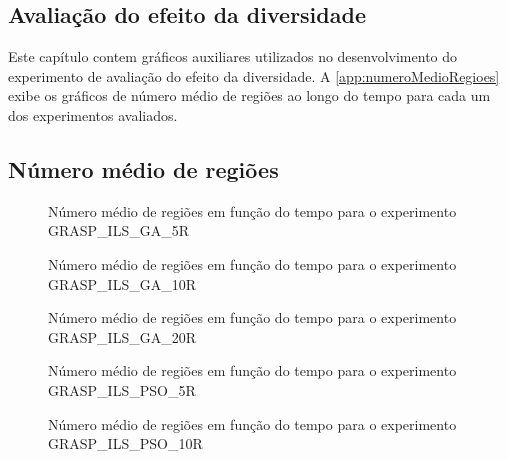 \begin{apendicesenv}
\partapendices

\chapter{Avaliação do efeito da diversidade}
Este capítulo contem gráficos auxiliares utilizados no desenvolvimento do experimento de avaliação do efeito da diversidade. A  \autoref{app:numeroMedioRegioes} exibe os gráficos de número médio de regiões ao longo do tempo para cada um dos experimentos avaliados. 

\section{Número médio de regiões}
\label{app:numeroMedioRegioes}

\begin{figure}
    \centering
    \caption{Número médio de regiões em função do tempo para o experimento GRASP\_ILS\_GA\_5R}
    
    \label{grasp_ils_ga_5r}
\end{figure}

\begin{figure}
    \centering
    \caption{Número médio de regiões em função do tempo para o experimento GRASP\_ILS\_GA\_10R}
    
    \label{grasp_ils_ga_10R}
\end{figure}

\begin{figure}
    \centering
    \caption{Número médio de regiões em função do tempo para o experimento GRASP\_ILS\_GA\_20R}
    
    \label{grasp_ils_ga_20r}
\end{figure}


\begin{figure}
    \centering
    \caption{Número médio de regiões em função do tempo para o experimento GRASP\_ILS\_PSO\_5R}
    
\end{figure}

\begin{figure}
    \centering
    \caption{Número médio de regiões em função do tempo para o experimento GRASP\_ILS\_PSO\_10R}
    
\end{figure}


\end{apendicesenv}
